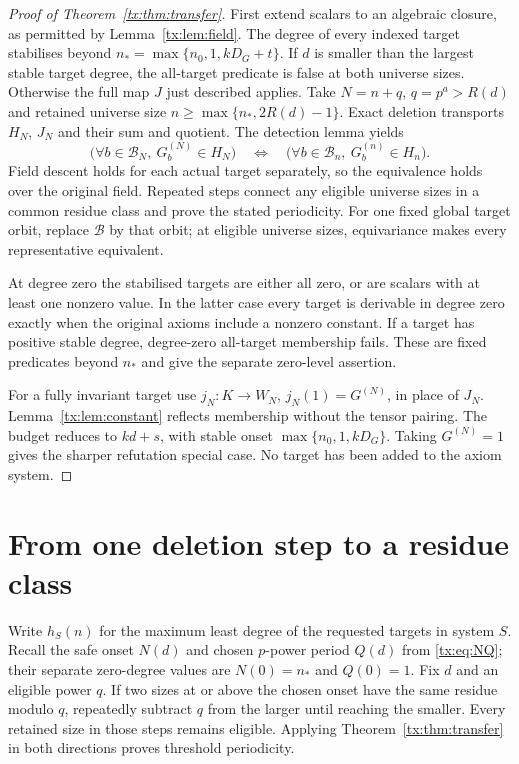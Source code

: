 \documentclass[11pt,a4paper,oneside,openany]{book}
\theoremstyle{definition}\newtheorem{definition}[theorem]{Definition}
\theoremstyle{remark}\newtheorem{remark}[theorem]{Remark}
\numberwithin{equation}{chapter}
\begin{document}
\begin{proof}[Proof of Theorem~\ref{tx:thm:transfer}]
First extend scalars to an algebraic closure, as permitted by
Lemma~\ref{tx:lem:field}. The degree of every indexed target stabilises
beyond $n_*=\max\{n_0,1,kD_G+t\}$. If $d$ is smaller than the
largest stable target degree, the all-target predicate is false at both
universe sizes. Otherwise the full map $J$ just described applies.
Take $N=n+q$, $q=p^a>R(d)$ and retained universe size
$n\ge\max\{n_*,2R(d)-1\}$. Exact deletion transports $H_N$, $J_N$
and their sum and quotient. The detection lemma yields
\[
 \bigl(\forall b\in\mathcal B_N,\ G_b^{(N)}\in H_N\bigr)
 \quad\Longleftrightarrow\quad
 \bigl(\forall b\in\mathcal B_n,\ G_b^{(n)}\in H_n\bigr).
\]
Field descent holds for each actual target separately, so the equivalence
holds over the original field. Repeated steps connect any eligible
universe sizes in a common residue class and prove the stated periodicity.
For one fixed global target orbit, replace $\mathcal B$ by that orbit;
at eligible universe sizes, equivariance makes every representative equivalent.

At degree zero the stabilised targets are either all zero, or are
scalars with at least one nonzero value. In the latter case every target
is derivable in degree zero exactly when the original axioms include a
nonzero constant. If a target has positive stable degree, degree-zero
all-target membership fails. These are fixed predicates beyond $n_*$
and give the separate zero-level assertion.

For a fully invariant target use $j_N:K\to W_N$, $j_N(1)=G^{(N)}$,
in place of $J_N$. Lemma~\ref{tx:lem:constant} reflects membership without
the tensor pairing. The budget reduces to $kd+s$, with stable onset
$\max\{n_0,1,kD_G\}$. Taking $G^{(N)}=1$ gives the sharper refutation
special case. No target has been added to the axiom system.
\end{proof}


\section{From one deletion step to a residue class}
Write $h_S(n)$ for the maximum least degree of the requested targets
in system $S$. Recall the safe onset $N(d)$ and chosen $p$-power period
$Q(d)$ from \eqref{tx:eq:NQ}; their separate zero-degree values are
$N(0)=n_*$ and $Q(0)=1$.
Fix $d$ and an eligible power $q$. If two sizes at or above the chosen
onset have the same residue modulo $q$, repeatedly subtract $q$ from
the larger until reaching the smaller. Every retained size in those
steps remains eligible. Applying Theorem~\ref{tx:thm:transfer} in both
directions proves threshold periodicity.
\end{document}
